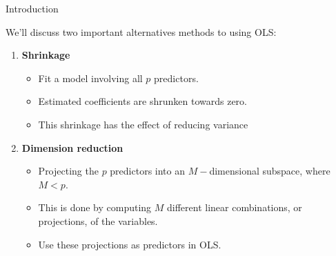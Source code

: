 \begin{frame}{Introduction}

We'll discuss two important alternatives methods to using OLS: \pause 

\begin{enumerate}
    \item \textbf{Shrinkage} \pause  
    \begin{itemize}
        \item Fit a model involving all $p$ predictors. \pause 

        \item Estimated coeﬃcients are shrunken towards zero. \pause 

        \item This shrinkage has the eﬀect of reducing variance \pause 
    \end{itemize}

    \item \textbf{Dimension reduction} \pause 
    \begin{itemize}
        \item Projecting the $p$ predictors into an $M-$dimensional subspace, where $M < p$. \pause 

        \item This is done by computing $M$ diﬀerent linear combinations, or projections, of the variables. \pause 
        
        \item Use these projections as predictors in OLS. 
    \end{itemize}
    
\end{enumerate}

    
\end{frame}






